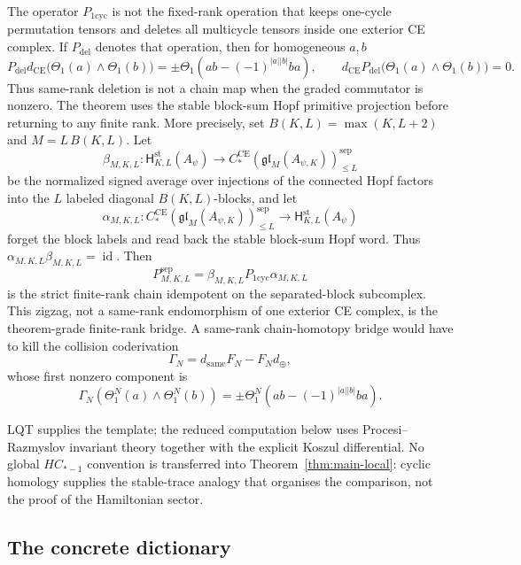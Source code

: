 \documentclass[11pt]{memoir}
\begin{document}
\begin{rmk}
  The operator \(P_{1\mathrm{cyc}}\) is not the fixed-rank operation that
  keeps one-cycle permutation tensors and deletes all multicycle tensors
  inside one exterior CE complex.  If \(P_{\mathrm{del}}\) denotes that
  operation, then for homogeneous \(a,b\)
  \[
    P_{\mathrm{del}}d_{\mathrm{CE}}
    \bigl(\Theta_1(a)\wedge\Theta_1(b)\bigr)
    =
    \pm\Theta_1(ab-(-1)^{|a||b|}ba),
    \qquad
    d_{\mathrm{CE}}P_{\mathrm{del}}
    \bigl(\Theta_1(a)\wedge\Theta_1(b)\bigr)=0 .
  \]
  Thus same-rank deletion is not a chain map when the graded commutator
  is nonzero.  The theorem uses the stable block-sum Hopf primitive
  projection before returning to any finite rank.  More precisely, set
  \(B(K,L)=\max(K,L+2)\) and \(M=L\,B(K,L)\).  Let
  \[
    \beta_{M,K,L}\colon
    \mathsf H^{\mathrm{st}}_{K,L}(A_\psi)
    \to
    C_*^{\mathrm{CE}}(\mathfrak{gl}_M(A_{\psi,K}))^{\mathrm{sep}}_{\le L}
  \]
  be the normalized signed average over injections of the connected Hopf
  factors into the \(L\) labeled diagonal \(B(K,L)\)-blocks, and let
  \[
    \alpha_{M,K,L}\colon
    C_*^{\mathrm{CE}}(\mathfrak{gl}_M(A_{\psi,K}))^{\mathrm{sep}}_{\le L}
    \to
    \mathsf H^{\mathrm{st}}_{K,L}(A_\psi)
  \]
  forget the block labels and read back the stable block-sum Hopf word.
  Thus \(\alpha_{M,K,L}\beta_{M,K,L}=\operatorname{id}\).
  Then
  \[
    P^{\mathrm{sep}}_{M,K,L}
    =
    \beta_{M,K,L}P_{1\mathrm{cyc}}\alpha_{M,K,L}
  \]
  is the strict finite-rank chain idempotent on the separated-block
  subcomplex.  This zigzag, not a same-rank endomorphism of one exterior
  CE complex, is the theorem-grade finite-rank bridge.  A same-rank
  chain-homotopy bridge would have to kill the collision coderivation
  \[
    \Gamma_N=d_{\mathrm{same}}F_N-F_Nd_{\oplus},
  \]
  whose first nonzero component is
  \[
    \Gamma_N(\Theta_1^N(a)\wedge\Theta_1^N(b))
    =
    \pm\Theta_1^N(ab-(-1)^{|a||b|}ba).
  \]
\end{rmk}
LQT supplies the template; the reduced computation below uses
Procesi--Razmyslov invariant theory together with the explicit Koszul
differential. No global $HC_{*-1}$ convention is transferred into
Theorem~\ref{thm:main-local}: cyclic homology supplies the
stable-trace analogy that organises the comparison, not the proof of
the Hamiltonian sector.

\subsection{The concrete dictionary}
\end{document}
